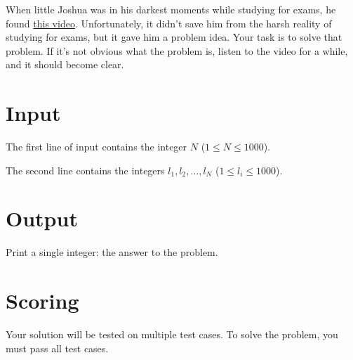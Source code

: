 \noindent
When little Joshua was in his darkest moments while studying for exams, he found
\href{https://www.youtube.com/watch?v=1xtFp2Wu_To}{this video}. Unfortunately, it didn't save him
from the harsh reality of studying for exams, but it gave him a problem idea. Your task
is to solve that problem. If it's not obvious what the problem is, listen to the video for a
while, and it should become clear.

\section*{Input}
\noindent
The first line of input contains the integer $N$ ($1 \leq N \leq 1000$).

The second line contains the integers $l_1, l_2, \dots, l_N$ ($1 \leq l_i \leq 1000$).

\section*{Output}
\noindent
Print a single integer: the answer to the problem.

\section*{Scoring}
Your solution will be tested on multiple test cases.
\noindent
To solve the problem, you must pass all test cases.